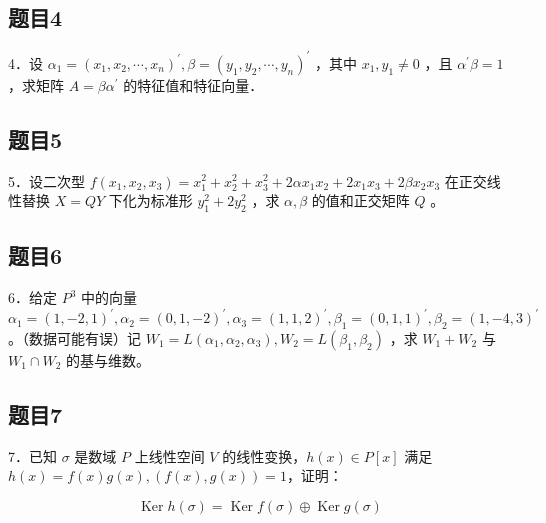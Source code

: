 \documentclass{article}
\begin{document}
\subsection{题目4}
4．设 \(\alpha_{1}=\left(x_{1}, x_{2}, \cdots, x_{n}\right)^{\prime}, \beta=\left(y_{1}, y_{2}, \cdots, y_{n}\right)^{\prime}\) ，其中 \(x_{1}, y_{1} \neq 0\) ，且 \(\alpha^{\prime} \beta=1\) ，求矩阵 \(A=\beta \alpha^{\prime}\) 的特征值和特征向量．

\subsection{题目5}
5．设二次型 \(f\left(x_{1}, x_{2}, x_{3}\right)=x_{1}^{2}+x_{2}^{2}+x_{3}^{2}+2 \alpha x_{1} x_{2}+2 x_{1} x_{3}+2 \beta x_{2} x_{3}\) 在正交线性替换 \(X=Q Y\) 下化为标准形 \(y_{1}^{2}+2 y_{2}^{2}\) ，求 \(\alpha, \beta\) 的值和正交矩阵 \(Q\) 。

\subsection{题目6}
6．给定 \(P^{3}\) 中的向量\\
\(\alpha_{1}=(1,-2,1)^{\prime}, \alpha_{2}=(0,1,-2)^{\prime}, \alpha_{3}=(1,1,2)^{\prime}, \beta_{1}=(0,1,1)^{\prime}, \beta_{2}=(1,-4,3)^{\prime}\) 。（数据可能有误）记 \(W_{1}=L\left(\alpha_{1}, \alpha_{2}, \alpha_{3}\right), W_{2}=L\left(\beta_{1}, \beta_{2}\right)\) ，求 \(W_{1}+W_{2}\) 与 \(W_{1} \cap W_{2}\) 的基与维数。

\subsection{题目7}
7．已知 \(\sigma\) 是数域 \(P\) 上线性空间 \(V\) 的线性变换，\(h(x) \in P[x]\) 满足 \(h(x)=f(x) g(x),(f(x), g(x))=1\)，证明：

\[
\operatorname{Ker} h(\sigma)=\operatorname{Ker} f(\sigma) \oplus \operatorname{Ker} g(\sigma)
\]
\end{document}
